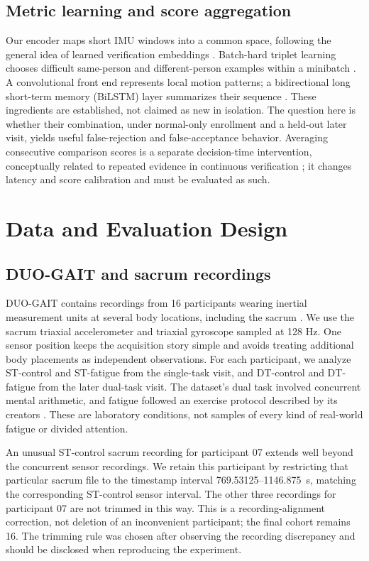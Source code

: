 \documentclass[conference]{IEEEtran}
\begin{document}
\subsection{Metric learning and score aggregation}
Our encoder maps short IMU windows into a common space, following the general idea of learned verification embeddings \cite{Schroff2015}. Batch-hard triplet learning chooses difficult same-person and different-person examples within a minibatch \cite{Hermans2017}. A convolutional front end represents local motion patterns; a bidirectional long short-term memory (BiLSTM) layer summarizes their sequence \cite{Hochreiter1997,Schuster1997}. These ingredients are established, not claimed as new in isolation. The question here is whether their combination, under normal-only enrollment and a held-out later visit, yields useful false-rejection and false-acceptance behavior. Averaging consecutive comparison scores is a separate decision-time intervention, conceptually related to repeated evidence in continuous verification \cite{Sim2007}; it changes latency and score calibration and must be evaluated as such.

\section{Data and Evaluation Design}
\subsection{DUO-GAIT and sacrum recordings}
DUO-GAIT contains recordings from 16 participants wearing inertial measurement units at several body locations, including the sacrum \cite{Zhou2023}. We use the sacrum triaxial accelerometer and triaxial gyroscope sampled at 128 Hz. One sensor position keeps the acquisition story simple and avoids treating additional body placements as independent observations. For each participant, we analyze ST-control and ST-fatigue from the single-task visit, and DT-control and DT-fatigue from the later dual-task visit. The dataset's dual task involved concurrent mental arithmetic, and fatigue followed an exercise protocol described by its creators \cite{Zhou2023}. These are laboratory conditions, not samples of every kind of real-world fatigue or divided attention.

An unusual ST-control sacrum recording for participant 07 extends well beyond the concurrent sensor recordings. We retain this participant by restricting that particular sacrum file to the timestamp interval 769.53125--1146.875~s, matching the corresponding ST-control sensor interval. The other three recordings for participant 07 are not trimmed in this way. This is a recording-alignment correction, not deletion of an inconvenient participant; the final cohort remains 16. The trimming rule was chosen after observing the recording discrepancy and should be disclosed when reproducing the experiment.
\end{document}
